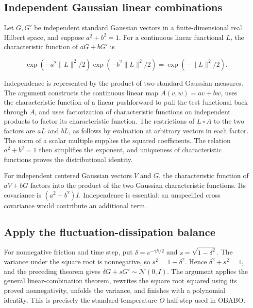 \documentclass[11pt,a4paper]{report}
\begin{document}
\subsection{\texorpdfstring{Independent Gaussian linear combinations}{Independent Gaussian linear combinations}}
\label{report-step-KineticLangevin-Thermostat-lean-1}


Let \(G,G\prime\) be independent standard Gaussian vectors in a finite-dimensional real Hilbert space, and suppose \(a^2+b^2=1\). For a continuous linear functional \(L\), the characteristic function of \(aG+bG\prime\) is

\[\exp(-a^2\|L\|^2/2)\exp(-b^2\|L\|^2/2)=\exp(-\|L\|^2/2).\]

Independence is represented by the product of two standard Gaussian measures. The argument constructs the continuous linear map \(A(v,w)=av+bw\), uses the characteristic function of a linear pushforward to pull the test functional back through \(A\), and uses factorization of characteristic functions on independent products to factor its characteristic function. The restrictions of \(L\circ A\) to the two factors are \(aL\) and \(bL\), as follows by evaluation at arbitrary vectors in each factor. The norm of a scalar multiple supplies the squared coefficients. The relation \(a^2+b^2=1\) then simplifies the exponent, and uniqueness of characteristic functions proves the distributional identity.



For independent centered Gaussian vectors \(V\) and \(G\), the characteristic function of \(aV+bG\) factors into the product of the two Gaussian characteristic functions. Its covariance is \((a^2+b^2)I\). Independence is essential: an unspecified cross covariance would contribute an additional term.

\subsection{\texorpdfstring{Apply the fluctuation-dissipation balance}{Apply the fluctuation-dissipation balance}}
\label{report-step-KineticLangevin-Thermostat-lean-2}


For nonnegative friction and time step, put \(\delta=e^{-\gamma h/2}\) and \(s=\sqrt{1-\delta^2}\). The variance under the square root is nonnegative, so \(s^2=1-\delta^2\). Hence \(\delta^2+s^2=1\), and the preceding theorem gives \(\delta G+sG\prime\sim\mathcal N(0,I)\). The argument applies the general linear-combination theorem, rewrites the square root squared using its proved nonnegativity, unfolds the variance, and finishes with a polynomial identity. This is precisely the standard-temperature \(O\) half-step used in OBABO.
\end{document}
